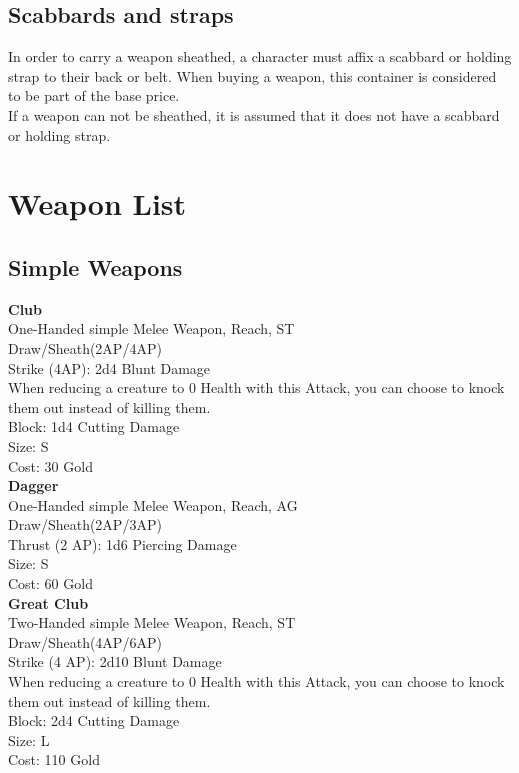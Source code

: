 \subsection{Scabbards and straps}\label{subsec:scabbards}
In order to carry a weapon sheathed, a character must affix a scabbard or holding strap to their back or belt.
When buying a weapon, this container is considered to be part of the base price.\\
If a weapon can not be sheathed, it is assumed that it does not have a scabbard or holding strap.

\section{Weapon List}\label{sec:weaponList}
\subsection{Simple Weapons}\label{subsec:simpleWeapons}
\textbf{Club}\label{weapon:club}\\
One-Handed simple Melee Weapon,  Reach, ST\\
Draw/Sheath(2AP/4AP)\\
Strike (4AP): 2d4 Blunt Damage\\
When reducing a creature to 0 Health with this Attack, you can choose to knock them out instead of killing them.\\
Block: 1d4 Cutting Damage\\
Size: S\\
Cost: 30 Gold\\

\textbf{Dagger}\label{weapon:dagger}\\
One-Handed simple Melee Weapon,  Reach, AG\\
Draw/Sheath(2AP/3AP)\\
Thrust (2 AP): 1d6 Piercing Damage\\
Size: S\\
Cost: 60 Gold\\

\textbf{Great Club}\label{weapon:greatClub}\\
Two-Handed simple Melee Weapon,  Reach, ST\\
Draw/Sheath(4AP/6AP)\\
Strike (4 AP): 2d10 Blunt Damage\\
When reducing a creature to 0 Health with this Attack, you can choose to knock them out instead of killing them.\\
Block: 2d4 Cutting Damage\\
Size: L\\
Cost: 110 Gold\\

